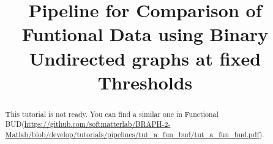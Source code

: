 \documentclass[justified]{tufte-handout}
\title{Pipeline for Comparison of Funtional Data using Binary Undirected graphs at fixed Thresholds}
\begin{document}
\maketitle

\begin{abstract}
\noindent
This tutorial is not ready. You can find a similar one in Functional BUD(\url{https://github.com/softmatterlab/BRAPH-2-Matlab/blob/develop/tutorials/pipelines/tut_a_fun_bud/tut_a_fun_bud.pdf}).
\end{abstract}
\end{document}
